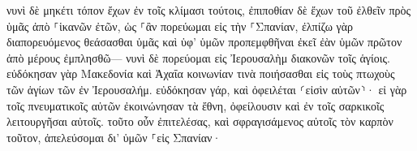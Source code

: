 \documentclass{openreader}
\begin{document}
νυνὶ δὲ μηκέτι τόπον ἔχων ἐν τοῖς κλίμασι τούτοις, ἐπιποθίαν δὲ ἔχων τοῦ ἐλθεῖν πρὸς ὑμᾶς ἀπὸ ⸀ἱκανῶν ἐτῶν, 
ὡς ⸀ἂν πορεύωμαι εἰς τὴν ⸀Σπανίαν, ἐλπίζω γὰρ διαπορευόμενος θεάσασθαι ὑμᾶς καὶ ὑφ’ ὑμῶν προπεμφθῆναι ἐκεῖ ἐὰν ὑμῶν πρῶτον ἀπὸ μέρους ἐμπλησθῶ— 
νυνὶ δὲ πορεύομαι εἰς Ἰερουσαλὴμ διακονῶν τοῖς ἁγίοις. 
εὐδόκησαν γὰρ Μακεδονία καὶ Ἀχαΐα κοινωνίαν τινὰ ποιήσασθαι εἰς τοὺς πτωχοὺς τῶν ἁγίων τῶν ἐν Ἰερουσαλήμ. 
εὐδόκησαν γάρ, καὶ ὀφειλέται ⸂εἰσὶν αὐτῶν⸃· εἰ γὰρ τοῖς πνευματικοῖς αὐτῶν ἐκοινώνησαν τὰ ἔθνη, ὀφείλουσιν καὶ ἐν τοῖς σαρκικοῖς λειτουργῆσαι αὐτοῖς. 
τοῦτο οὖν ἐπιτελέσας, καὶ σφραγισάμενος αὐτοῖς τὸν καρπὸν τοῦτον, ἀπελεύσομαι δι’ ὑμῶν ⸀εἰς Σπανίαν· 
\end{document}
